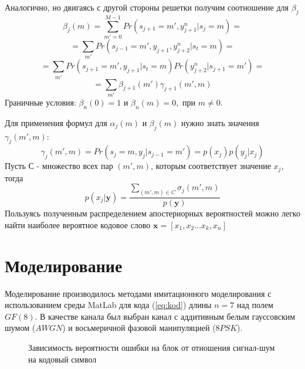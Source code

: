 \documentclass{ITaSconf}
\begin{document}
	Аналогично, но двигаясь с другой стороны решетки получим соотношение для $\beta_j$
$$\beta_j(m)=\sum\limits_{m'=0}^{M-1}Pr(s_{j+1}=m',y_{j+1}^n|s_j=m)=$$$$=\sum\limits_{m'}Pr(s_{j-1}=m',y_{j+1},y_{j+2}^n|s_t=m)=$$$$=\sum\limits_{m'}Pr(s_{j+1}=m',y_{j+1}|s_t=m)Pr(y_{j+2}^n|s_{j+1}=m')=$$$$=\sum\limits_{m'}\beta_{j+1}(m')\gamma_{j+1}(m',m)$$
Граничные условия: $ \beta_n(0)=1$ и $\beta_n(m)=0,$ при $m\neq0$.

Для применения формул для $\alpha_j(m)$ и $\beta_j(m)$ нужно знать значения $\gamma_j(m',m)$:
$$\gamma_j(m',m)=Pr(s_j=m,y_j|s_{j-1}=m')=p(x_j)p(y_j|x_j)$$ 
Пусть С - множество всех пар $(m',m)$, которым соответствует значение $x_j$, тогда 
$$p(x_j|\mathbold{y}) = \frac{\sum_{(m',m)\in C}\sigma_j(m',m)}{p(\mathbold{y})}$$ 
Пользуясь полученным распределением апостериорных вероятностей можно легко найти наиболее вероятное кодовое слово $\mathbold{x}=[x_1, x_2 \dots x_k, x_n]$

\section{Моделирование}
\label{sec:model}

Моделирование производилось методами имитационного моделирования с использованием среды MatLab для кода (\ref{eq:kod}) длины $n = 7$ над полем $GF(8)$. В качестве канала был выбран канал с аддитивным белым гауссовским шумом ($AWGN$) и восьмеричной фазовой манипуляцией ($8PSK$). 

\begin{figure} [h]
\caption{Зависимость вероятности ошибки на блок от отношения сигнал-шум на кодовый символ}
\label{fig:block}
\end{figure}
\end{document}

